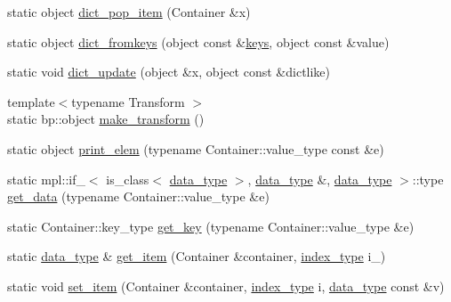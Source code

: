 \begin{DoxyCompactItemize}
static object \hyperlink{classboost_1_1python_1_1std__map__indexing__suite_af207a28bb4d4a7fa8364139dd0484a84}{dict\+\_\+pop\+\_\+item} (Container \&x)
\item 
static object \hyperlink{classboost_1_1python_1_1std__map__indexing__suite_a8aedb678ae655adaf30a5f0200fdeda9}{dict\+\_\+fromkeys} (object const \&\hyperlink{classboost_1_1python_1_1std__map__indexing__suite_a1d08ce35eb71bc9248f64a515d6d9775}{keys}, object const \&value)
\item 
static void \hyperlink{classboost_1_1python_1_1std__map__indexing__suite_a77daf7a1f7b0da0d6035e91dfa118899}{dict\+\_\+update} (object \&x, object const \&dictlike)
\item 
{\footnotesize template$<$typename Transform $>$ }\\static bp\+::object \hyperlink{classboost_1_1python_1_1std__map__indexing__suite_ad2e6c20740dd4ad7058f04e958fc499c}{make\+\_\+transform} ()
\item 
static object \hyperlink{classboost_1_1python_1_1std__map__indexing__suite_a1147c134bf910497fb9a467a21522933}{print\+\_\+elem} (typename Container\+::value\+\_\+type const \&e)
\item 
static mpl\+::if\+\_\+$<$ is\+\_\+class$<$ \hyperlink{classboost_1_1python_1_1std__map__indexing__suite_a3e9a6a8b8ba34759cf0ba99fe5966041}{data\+\_\+type} $>$, \hyperlink{classboost_1_1python_1_1std__map__indexing__suite_a3e9a6a8b8ba34759cf0ba99fe5966041}{data\+\_\+type} \&, \hyperlink{classboost_1_1python_1_1std__map__indexing__suite_a3e9a6a8b8ba34759cf0ba99fe5966041}{data\+\_\+type} $>$\+::type \hyperlink{classboost_1_1python_1_1std__map__indexing__suite_a7c13569acfb66f1adb8d92c581091654}{get\+\_\+data} (typename Container\+::value\+\_\+type \&e)
\item 
static Container\+::key\+\_\+type \hyperlink{classboost_1_1python_1_1std__map__indexing__suite_a28a13c6039a1305e3605c6ca3a9803d9}{get\+\_\+key} (typename Container\+::value\+\_\+type \&e)
\item 
static \hyperlink{classboost_1_1python_1_1std__map__indexing__suite_a3e9a6a8b8ba34759cf0ba99fe5966041}{data\+\_\+type} \& \hyperlink{classboost_1_1python_1_1std__map__indexing__suite_a8650d42e8d1d7e095f6cfc9e664f0fab}{get\+\_\+item} (Container \&container, \hyperlink{classboost_1_1python_1_1std__map__indexing__suite_a4b2ac75883fba93dbca6d9e83197c842}{index\+\_\+type} i\+\_\+)
\item 
static void \hyperlink{classboost_1_1python_1_1std__map__indexing__suite_a5dc3dd492671db19152e7c64b62e9f97}{set\+\_\+item} (Container \&container, \hyperlink{classboost_1_1python_1_1std__map__indexing__suite_a4b2ac75883fba93dbca6d9e83197c842}{index\+\_\+type} i, \hyperlink{classboost_1_1python_1_1std__map__indexing__suite_a3e9a6a8b8ba34759cf0ba99fe5966041}{data\+\_\+type} const \&v)

\end{DoxyCompactItemize}
